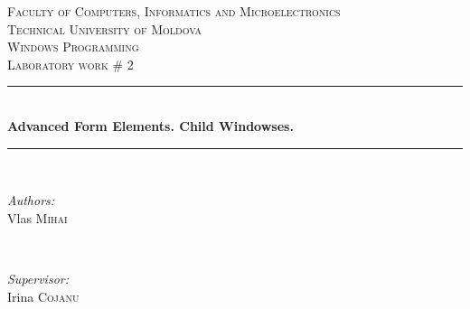 \documentclass[12pt]{article}
\begin{document}
  \begin{titlepage}

 \newcommand{\HRule}{\rule{\linewidth}{0.5mm}} %
  \begin{center} %

  \textsc{\large Faculty of Computers, Informatics and Microelectronics}\\[0.5cm]
  \textsc{\large Technical University of Moldova}\\[1.2cm] %
  \vspace{35 mm}
  \textsc{\Large Windows Programming}\\[0.5cm] %
  \textsc{\large Laboratory work \# 2}\\[0.5cm] %

  \vspace{10 mm}
  \HRule \\[0.4cm]
  { \LARGE \bfseries 
Advanced Form Elements. Child Windowses. }\\[0.4cm] %
  \HRule \\[1.5cm]

      \vspace{30mm}

      \begin{minipage}{0.4\textwidth}
      \begin{flushleft} \large
      \emph{Authors:}\\
      Vlas \textsc{Mihai}
      \end{flushleft}
      \end{minipage}
      ~
      \begin{minipage}{0.4\textwidth}
      \begin{flushright} \large
      \emph{Supervisor:} \\
      Irina \textsc{Cojanu} %
      \end{flushright}
      \end{minipage}\\[4cm]


\end{center}
\end{titlepage}
\end{document}
